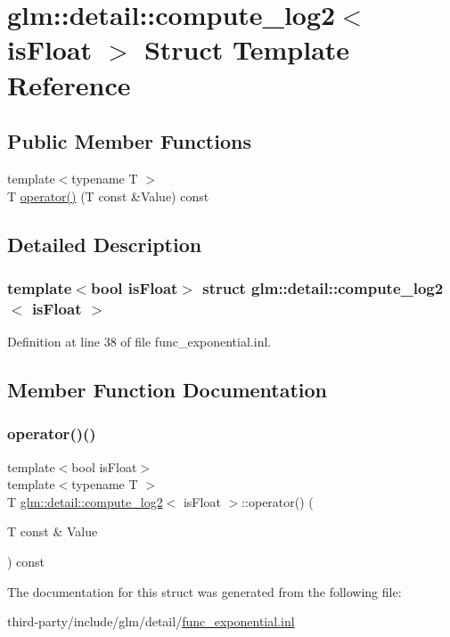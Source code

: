 \hypertarget{structglm_1_1detail_1_1compute__log2}{}\section{glm\+:\+:detail\+:\+:compute\+\_\+log2$<$ is\+Float $>$ Struct Template Reference}
\label{structglm_1_1detail_1_1compute__log2}
\subsection*{Public Member Functions}
\begin{DoxyCompactItemize}
\item 
{\footnotesize template$<$typename T $>$ }\\T \hyperlink{structglm_1_1detail_1_1compute__log2_ae9594897221e54d924bbb14a10576b3c}{operator()} (T const \&Value) const
\end{DoxyCompactItemize}


\subsection{Detailed Description}
\subsubsection*{template$<$bool is\+Float$>$\newline
struct glm\+::detail\+::compute\+\_\+log2$<$ is\+Float $>$}



Definition at line 38 of file func\+\_\+exponential.\+inl.



\subsection{Member Function Documentation}
\mbox{\label{structglm_1_1detail_1_1compute__log2_ae9594897221e54d924bbb14a10576b3c}} 
\subsubsection{\texorpdfstring{operator()()}{operator()()}}
{\footnotesize\ttfamily template$<$bool is\+Float$>$ \\
template$<$typename T $>$ \\
T \hyperlink{structglm_1_1detail_1_1compute__log2}{glm\+::detail\+::compute\+\_\+log2}$<$ is\+Float $>$\+::operator() (\begin{DoxyParamCaption}\item[{T const \&}]{Value }\end{DoxyParamCaption}) const}



The documentation for this struct was generated from the following file\+:\begin{DoxyCompactItemize}
\item 
third-\/party/include/glm/detail/\hyperlink{func__exponential_8inl}{func\+\_\+exponential.\+inl}\end{DoxyCompactItemize}
